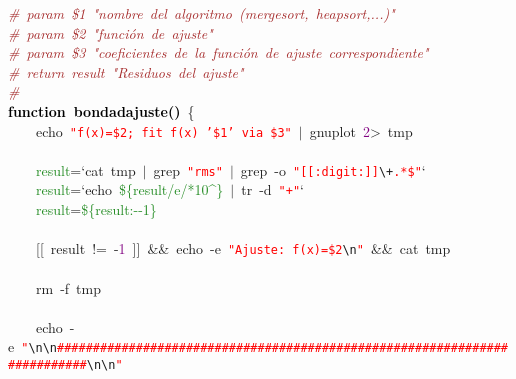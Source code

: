 \mbox{}\textit{\textcolor{Brown}{\#\ param\ \$1\ "{}nombre\ del\ algoritmo\ (mergesort,\ heapsort,...)"{}}} \\
\mbox{}\textit{\textcolor{Brown}{\#\ param\ \$2\ "{}función\ de\ ajuste"{}}} \\
\mbox{}\textit{\textcolor{Brown}{\#\ param\ \$3\ "{}coeficientes\ de\ la\ función\ de\ ajuste\ correspondiente"{}}} \\
\mbox{}\textit{\textcolor{Brown}{\#\ return\ result\ "{}Residuos\ del\ ajuste"{}}} \\
\mbox{}\textit{\textcolor{Brown}{\#}} \\
\mbox{}\textbf{\textcolor{Black}{function\ bondadajuste()}}\ \{ \\
\mbox{}\ \ \ \ echo\ \texttt{\textcolor{Red}{"{}f(x)=\$2;\ fit\ f(x)\ '\$1'\ via\ \$3"{}}}\ \textcolor{BrickRed}{$|$}\ gnuplot\ \textcolor{Purple}{2}\textcolor{BrickRed}{\textgreater{}}\ tmp \\
\mbox{}\ \ \ \  \\
\mbox{}\ \ \ \ \textcolor{ForestGreen}{result}\textcolor{BrickRed}{=}`cat\ tmp\ \textcolor{BrickRed}{$|$}\ grep\ \texttt{\textcolor{Red}{"{}rms"{}}}\ \textcolor{BrickRed}{$|$}\ grep\ -o\ \texttt{\textcolor{Red}{"{}[[:digit:]]}}\texttt{\textcolor{CarnationPink}{\textbackslash{}+}}\texttt{\textcolor{Red}{.*\$"{}}}` \\
\mbox{}\ \ \ \ \textcolor{ForestGreen}{result}\textcolor{BrickRed}{=}`echo\ \textcolor{ForestGreen}{\$\{result/e/*10\textasciicircum{}\}}\ \textcolor{BrickRed}{$|$}\ tr\ -d\ \texttt{\textcolor{Red}{"{}+"{}}}`\  \\
\mbox{}\ \ \ \ \textcolor{ForestGreen}{result}\textcolor{BrickRed}{=}\textcolor{ForestGreen}{\$\{result:-\/-1\}} \\
\mbox{}\ \ \ \  \\
\mbox{}\ \ \ \ \textcolor{BrickRed}{[[}\ result\ \textcolor{BrickRed}{!=}\ -\textcolor{Purple}{1}\ \textcolor{BrickRed}{]]}\ \textcolor{BrickRed}{\&\&}\ echo\ -e\ \texttt{\textcolor{Red}{"{}Ajuste:\ f(x)=\$2}}\texttt{\textcolor{CarnationPink}{\textbackslash{}n}}\texttt{\textcolor{Red}{"{}}}\ \textcolor{BrickRed}{\&\&}\ cat\ tmp \\
\mbox{}\ \ \ \  \\
\mbox{}\ \ \ \ rm\ -f\ tmp \\
\mbox{}\ \ \ \  \\
\mbox{}\ \ \ \ echo\ -e\ \texttt{\textcolor{Red}{"{}}}\texttt{\textcolor{CarnationPink}{\textbackslash{}n\textbackslash{}n}}\texttt{\textcolor{Red}{\#\#\#\#\#\#\#\#\#\#\#\#\#\#\#\#\#\#\#\#\#\#\#\#\#\#\#\#\#\#\#\#\#\#\#\#\#\#\#\#\#\#\#\#\#\#\#\#\#\#\#\#\#\#\#\#\#\#\#\#\#\#\#\#\#\#\#\#\#\#\#\#\#\#}}\texttt{\textcolor{CarnationPink}{\textbackslash{}n\textbackslash{}n}}\texttt{\textcolor{Red}{"{}}} \\
